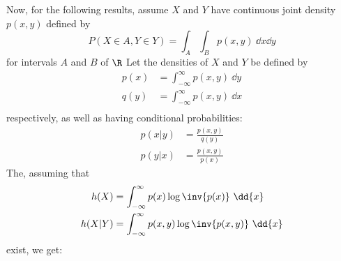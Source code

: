 Now, for the following results, assume $X$ and  $Y$ have continuous joint
density  $p(x,y)$ defined by
\begin{equation*}
    P(X \in A, Y \in Y)=\int_{A}{\int_{B}{p(x,y)} \ \dd{x}\dd{y}}
\end{equation*}
for intervals $A$ and  $B$ of  $\R$ Let the densities of  $X$ and  $Y$ be
defined by
\begin{align*}
    p(x) &= \int_{-\infty}^{\infty}{p(x,y)} \ \dd{y} \\
    q(y) &= \int_{-\infty}^{\infty}{p(x,y)} \ \dd{x} \\
\end{align*}
respectively, as well as having conditional probabilities:
\begin{align*}
    p(x|y) &= \frac{p(x,y)}{q(y)} \\
    p(y|x) &= \frac{p(x,y)}{p(x)}
\end{align*}
The, assuming that
\begin{align*}
    h(X) &= \int_{-\infty}^{\infty}{p(x)\log{\inv{p(x)}}} \ \dd{x} \\
    h(X|Y) &= \int_{-\infty}^{\infty}{p(x,y)\log{\inv{p(x,y)}}} \ \dd{x} \\
\end{align*}
exist, we get:

